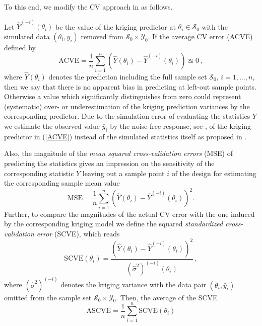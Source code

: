 \documentclass[article, nojss]{jss}
\numberwithin{equation}{section}			%
\newcommand{\Sample}{\mathcal{S}}
\begin{document}
To this end, we modify the CV approach in \citet[sect.~11]{ref:Wackernagel2003}
as follows.\par
%
Let $\hat{Y}^{(-i)}(\theta_{i})$ be the value of the kriging
predictor at $\theta_i\in\Sample_0$ with the simulated data
$\left(\theta_i,\bar{y}_i\right)$ removed from $\Sample_0\times\mathcal{Y}_0$.
If the average CV error (ACVE) defined by
\begin{equation}\label{ACVE}
\textrm{ACVE}=\frac{1}{n}\sum_{i=1}^n
\left(\hat{Y}(\theta_i)-\hat{Y}^{(-i)}(\theta_i)\right) \approxeq 0\,,
\end{equation}
where $\hat{Y}(\theta_i)$ denotes the prediction including the
full sample set $\Sample_0$, $i=1,\ldots,n$, then we say that there
is no apparent bias in predicting at left-out sample points. Otherwise a value 
which significantly distinguishes from zero could represent (systematic) over-
or underestimation of the kriging prediction variances by the corresponding
predictor. Due to the simulation error of evaluating the statistics $Y$ we
estimate the observed value $\bar{y}_i$ by the noise-free response, see
\citet[][sect.~3.7.1]{ref:ChilesDelfiner1999}, of the kriging predictor in
(\ref{ACVE}) instead of the simulated statistics itself as proposed in
\citet{ref:Wackernagel2003}.\par
%
Also, the magnitude of the \emph{mean squared cross-validation errors} (MSE) of
predicting the statistics gives an impression on the sensitivity of the corresponding
statistic $Y$ leaving out a sample point $i$ of the design for estimating the
corresponding sample mean value
\begin{equation}\label{MSE}    
  \textrm{MSE}=\frac{1}{n}\sum_{i=1}^n
  \left(\hat{Y}(\theta_i)-\hat{Y}^{(-i)}(\theta_i)\right)^2.
\end{equation}
Further, to compare the magnitudes of the actual CV error with the one induced
by the corresponding kriging model we define the squared \emph{standardized
cross-validation error} (SCVE), which reads
\begin{equation}\label{SCVE}    
  \textrm{SCVE}(\theta_i)=\frac{\left(\hat{Y}(\theta_i)-\hat{Y}^{(-i)}(\theta_i)\right)^2}{(\hat{\sigma}^2)^{(-i)}(\theta_i)}\,,
\end{equation}
where $(\hat{\sigma}^2)^{(-i)}$ denotes the kriging variance with the data pair $(\theta_i,\bar{y}_i)$
omitted from the sample set $\Sample_0\times\mathcal{Y}_0$. Then, the average of the SCVE
\begin{equation}\label{ASCVE}
\textrm{ASCVE}=\frac{1}{n}\sum_{i=1}^n \textrm{SCVE}(\theta_i)
\end{equation}
\end{document}
